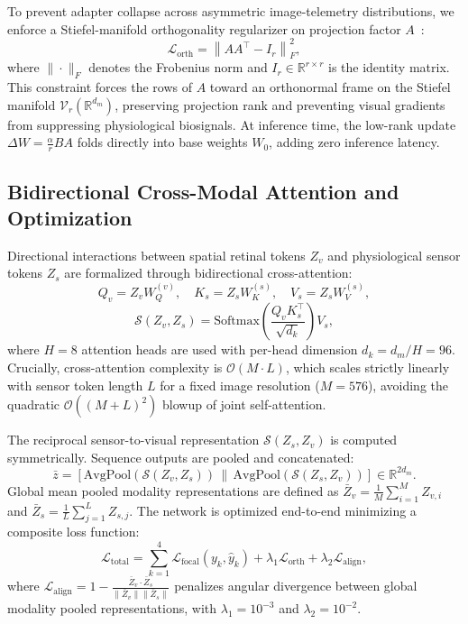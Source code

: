 \documentclass[journal,10pt,twocolumn]{IEEEtran}
\begin{document}
To prevent adapter collapse across asymmetric image-telemetry distributions, we enforce a Stiefel-manifold orthogonality regularizer on projection factor $A$~\cite{edelman1998geometry}:
\begin{equation}
    \mathcal{L}_{\text{orth}} = \left\| A A^\top - I_r \right\|_F^2,
    \label{eq:orth_loss}
\end{equation}
where $\|\cdot\|_F$ denotes the Frobenius norm and $I_r \in \mathbb{R}^{r \times r}$ is the identity matrix. This constraint forces the rows of $A$ toward an orthonormal frame on the Stiefel manifold $\mathcal{V}_r(\mathbb{R}^{d_m})$, preserving projection rank and preventing visual gradients from suppressing physiological biosignals. At inference time, the low-rank update $\Delta W = \frac{\alpha}{r}BA$ folds directly into base weights $W_0$, adding zero inference latency.

\subsection{Bidirectional Cross-Modal Attention and Optimization}
\label{sec:cross_attention}
Directional interactions between spatial retinal tokens $Z_v$ and physiological sensor tokens $Z_s$ are formalized through bidirectional cross-attention:
\begin{equation}
    Q_v = Z_v W_Q^{(v)}, \quad K_s = Z_s W_K^{(s)}, \quad V_s = Z_s W_V^{(s)},
\end{equation}
\begin{equation}
    \mathcal{S}(Z_v, Z_s) = \text{Softmax}\left( \frac{Q_v K_s^\top}{\sqrt{d_k}} \right) V_s,
    \label{eq:cross_attn}
\end{equation}
where $H=8$ attention heads are used with per-head dimension $d_k = d_m / H = 96$. Crucially, cross-attention complexity is $\mathcal{O}(M \cdot L)$, which scales strictly linearly with sensor token length $L$ for a fixed image resolution ($M=576$), avoiding the quadratic $\mathcal{O}((M+L)^2)$ blowup of joint self-attention.

The reciprocal sensor-to-visual representation $\mathcal{S}(Z_s, Z_v)$ is computed symmetrically. Sequence outputs are pooled and concatenated:
\begin{equation}
    \bar{z} = \left[ \text{AvgPool}(\mathcal{S}(Z_v, Z_s)) \,\|\, \text{AvgPool}(\mathcal{S}(Z_s, Z_v)) \right] \in \mathbb{R}^{2d_m}.
\end{equation}
Global mean pooled modality representations are defined as $\bar{Z}_v = \frac{1}{M}\sum_{i=1}^M Z_{v, i}$ and $\bar{Z}_s = \frac{1}{L}\sum_{j=1}^L Z_{s, j}$. The network is optimized end-to-end minimizing a composite loss function:
\begin{equation}
    \mathcal{L}_{\text{total}} = \sum_{k=1}^4 \mathcal{L}_{\text{focal}}(y_k, \hat{y}_k) + \lambda_1 \mathcal{L}_{\text{orth}} + \lambda_2 \mathcal{L}_{\text{align}},
    \label{eq:total_loss}
\end{equation}
where $\mathcal{L}_{\text{align}} = 1 - \frac{\bar{Z}_v \cdot \bar{Z}_s}{\|\bar{Z}_v\| \|\bar{Z}_s\|}$ penalizes angular divergence between global modality pooled representations, with $\lambda_1 = 10^{-3}$ and $\lambda_2 = 10^{-2}$.
\end{document}
